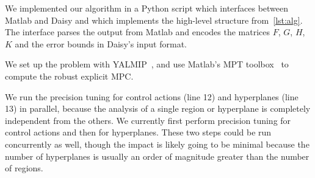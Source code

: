 We implemented our algorithm in a Python script which interfaces between Matlab
and Daisy and which implements the high-level structure from~\autoref{lst:alg}.
The interface parses the output from Matlab and encodes the matrices $F$,
$G$, $H$, $K$ and the error bounds in Daisy's input format. 

We set up the problem with YALMIP~\cite{matlabYALMIP}, and use 
Matlab's MPT toolbox~\cite{matlabMPT} to compute the robust explicit MPC.

We run the precision tuning for control actions (line 12) and hyperplanes (line 13) in
parallel, because the analysis of a single region or hyperplane is completely independent from
the others. 
We currently first perform precision tuning for control actions and then for
hyperplanes. These two steps could be run concurrently as well, though the
impact is likely going to be minimal because the number of hyperplanes is
usually an order of magnitude greater than the number of regions.


